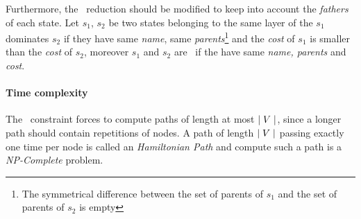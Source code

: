 Furthermore, the \mdd\ reduction should be modified to keep into account the \textit{fathers} of each state. Let $s_1$, $s_2$ be two states belonging to the same layer of the \mdd\; $s_1$ dominates $s_2$ if they have same \textit{name}, same \textit{parents}\footnote{The symmetrical difference between the set of parents of $s_1$ and the set of parents of $s_2$ is empty} and the \textit{cost} of $s_1$ is smaller than the \textit{cost} of $s_2$, moreover $s_1$ and $s_2$ are \compatibleState\ if the have same \textit{name, parents} and \textit{cost}.

\paragraph{Time complexity} The \alldiff\ constraint forces to compute paths of length at most $\mid V \mid$, since a longer path should contain repetitions of nodes. A path of length $\mid V \mid$ passing exactly one time per node is called an \textit{Hamiltonian Path} and compute such a path is a \textit{NP-Complete} problem.

